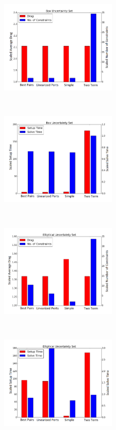 \begin{figure}[h]
    \centering
    \captionsetup{justification=centering, font=small}
    \begin{subfigure}{0.49\textwidth}
        \centering
        \includegraphics[height=1.85in]{simple_wing_results/box_obj_cons.png}
    \end{subfigure}%
    ~ 
    \begin{subfigure}{0.49\textwidth}
        \centering
        \includegraphics[height=1.85in]{simple_wing_results/box_times.png}
    \end{subfigure}
    ~
    \begin{subfigure}{0.49\textwidth}
        \centering
        \includegraphics[height=1.85in]{simple_wing_results/ell_obj_cons.png}
    \end{subfigure}%
    ~ 
    \begin{subfigure}{0.49\textwidth}
        \centering
        \includegraphics[height=1.85in]{simple_wing_results/ell_times.png}

\end{subfigure}
\end{figure}

